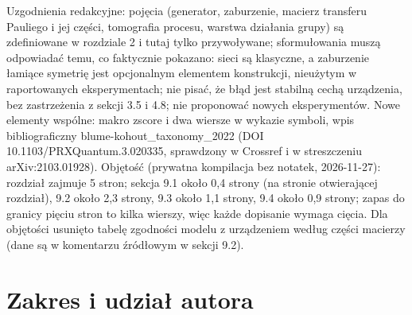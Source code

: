 {Uzgodnienia redakcyjne: pojęcia (generator, zaburzenie, macierz transferu Pauliego i jej części, tomografia procesu, warstwa działania grupy) są zdefiniowane w rozdziale 2 i tutaj tylko przywoływane; sformułowania muszą odpowiadać temu, co faktycznie pokazano: sieci są klasyczne, a zaburzenie łamiące symetrię jest opcjonalnym elementem konstrukcji, nieużytym w raportowanych eksperymentach; nie pisać, że błąd jest stabilną cechą urządzenia, bez zastrzeżenia z sekcji 3.5 i 4.8; nie proponować nowych eksperymentów.
Nowe elementy wspólne: makro zscore i dwa wiersze w wykazie symboli, wpis bibliograficzny blume-kohout_taxonomy_2022 (DOI 10.1103/PRXQuantum.3.020335, sprawdzony w Crossref i w streszczeniu arXiv:2103.01928).
Objętość (prywatna kompilacja bez notatek, 2026-11-27): rozdział zajmuje 5 stron; sekcja 9.1 około 0,4 strony (na stronie otwierającej rozdział), 9.2 około 2,3 strony, 9.3 około 1,1 strony, 9.4 około 0,9 strony; zapas do granicy pięciu stron to kilka wierszy, więc każde dopisanie wymaga cięcia.
Dla objętości usunięto tabelę zgodności modelu z urządzeniem według części macierzy (dane są w komentarzu źródłowym w sekcji 9.2).
}

\section{Zakres i udział autora}\label{sec:ns:scope}

